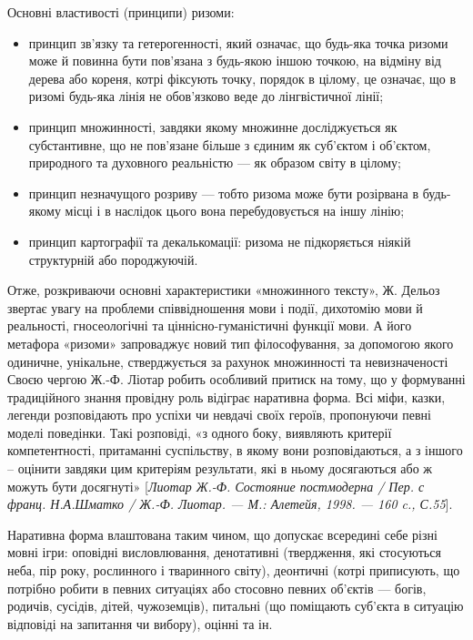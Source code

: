 Основні властивості (принципи) ризоми:
\begin{itemize}
	\item принцип зв’язку та гетерогенності, який означає, що будь-яка точка
	ризоми може й повинна бути пов’язана з будь-якою іншою точкою, на відміну
	від дерева або кореня, котрі фіксують точку, порядок в цілому, це означає, що в
	ризомі будь-яка лінія не обов’язково веде до лінгвістичної лінії;
	
	\item принцип множинності, завдяки якому множинне досліджується як
	субстантивне, що не пов’язане більше з єдиним як суб’єктом і об’єктом,
	природного та духовного реальністю --- як образом світу в цілому;

	\item принцип незначущого розриву --- тобто ризома може бути розірвана в
	будь-якому місці і в наслідок цього вона перебудовується на іншу лінію;

	\item принцип картографії та декалькомації: ризома не підкоряється ніякій
	структурній або породжуючій.
\end{itemize}

Отже, розкриваючи основні характеристики «множинного тексту», Ж.
Дельоз звертає увагу на проблеми співвідношення мови і події, дихотомію мови
й реальності, гносеологічні та ціннісно-гуманістичні функції мови. А його
метафора «ризоми» запроваджує новий тип філософування, за допомогою якого
одиничне, унікальне, стверджується за рахунок множинності та невизначеності
Своєю чергою Ж.-Ф. Ліотар робить особливий притиск на тому, що у
формуванні традиційного знання провідну роль відіграє наративна форма. Всі
міфи, казки, легенди розповідають про успіхи чи невдачі своїх героїв,
пропонуючи певні моделі поведінки. Такі розповіді, «з одного боку, виявляють
критерії компетентності, притаманні суспільству, в якому вони розповідаються, 
а з іншого – оцінити завдяки цим критеріям результати, які в ньому
досягаються або ж можуть бути досягнуті» [\textit{Лиотар Ж.-Ф. Состояние
постмодерна / Пер. с франц. Н.А.Шматко / Ж.-Ф. Лиотар. --- М.: Алетейя,
1998. --- 160 c., С.55}].

Наративна форма влаштована таким чином, що допускає всередині себе
різні мовні ігри: оповідні висловлювання, денотативні (твердження, які
стосуються неба, пір року, рослинного і тваринного світу), деонтичні (котрі
приписують, що потрібно робити в певних ситуаціях або стосовно певних
об’єктів --- богів, родичів, сусідів, дітей, чужоземців), питальні (що поміщають
суб’єкта в ситуацію відповіді на запитання чи вибору), оцінні та ін.

